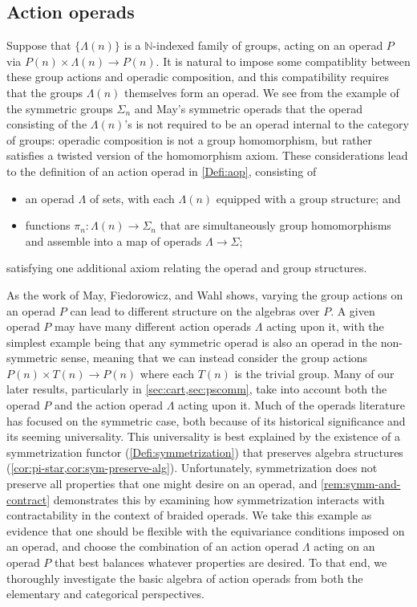 \subsection*{Action operads}

Suppose that $\{ \Lambda(n) \}$ is a $\mathbb{N}$-indexed family of groups, acting on an operad $P$ via $P(n) \times \Lambda(n) \to P(n)$.
It is natural to impose some compatiblity between these group actions and operadic composition, and this compatibility requires that the groups $\Lambda(n)$ themselves form an operad.
We see from the example of the symmetric groups $\Sigma_n$ and May's symmetric operads that the operad consisting of the $\Lambda(n)$'s is not required to be an operad internal to the category of groups: operadic composition is not a group homomorphism, but rather satisfies a twisted version of the homomorphism axiom.
These considerations lead to the definition of an action operad in \cref{Defi:aop}, consisting of 
\begin{itemize}
\item an operad $\Lambda$ of sets, with each $\Lambda(n)$ equipped with a group structure; and
\item functions $\pi_n \colon \Lambda(n) \to \Sigma_n$ that are simultaneously group homomorphisms and assemble into a map of operads $\Lambda \to \Sigma$;
\end{itemize}
satisfying one additional axiom relating the operad and group structures.

As the work of May, Fiedorowicz, and Wahl shows, varying the group actions on an operad $P$ can lead to different structure on the algebras over $P$.
A given operad $P$ may have many different action operads $\Lambda$ acting upon it, with the simplest example being that any symmetric operad is also an operad in the non-symmetric sense, meaning that we can instead consider the group actions $P(n) \times T(n) \to P(n)$ where each $T(n)$ is the trivial group.
Many of our later results, particularly in \cref{sec:cart,sec:pscomm}, take into account both the operad $P$ and the action operad $\Lambda$ acting upon it.
Much of the operads literature has focused on the symmetric case, both because of its historical significance and its seeming universality.
This universality is best explained by the existence of a symmetrization functor (\cref{Defi:symmetrization}) that preserves algebra structures (\cref{cor:pi-star,cor:sym-preserve-alg}).
Unfortunately, symmetrization does not preserve all properties that one might desire on an operad, and \cref{rem:symm-and-contract} demonstrates this by examining how symmetrization interacts with contractability in the context of braided operads.
We take this example as evidence that one should be flexible with the equivariance conditions imposed on an operad, and choose the combination of an action operad $\Lambda$ acting on an operad $P$ that best balances whatever properties are desired.
To that end, we thoroughly investigate the basic algebra of action operads from both the elementary and categorical perspectives.


